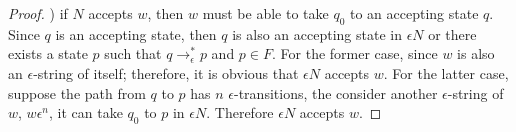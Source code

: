 \begin{proof}
\par {}) if \(N\) accepts \(w\), then \(w\) must be able to take \(q_0\) to an
accepting state \(q\). Since \(q\) is an accepting state, then \(q\)
is also an accepting state in \(\epsilon N\) or there exists a state 
\(p\) such that \(q \to_\epsilon^* p\) and \(p \in F\). For the former
case, since \(w\) is also an \(\epsilon\)-string of itself; therefore,
it is obvious that \(\epsilon N\) accepts \(w\). For the latter
case, suppose the path from \(q\) to \(p\) has \(n\)
\(\epsilon\)-transitions, the consider another \(\epsilon\)-string of
\(w\), \(w\epsilon^n\), it can take \(q_0\) to \(p\) in
\(\epsilon N\). Therefore \(\epsilon N\) accepts \(w\). 
\end{proof}